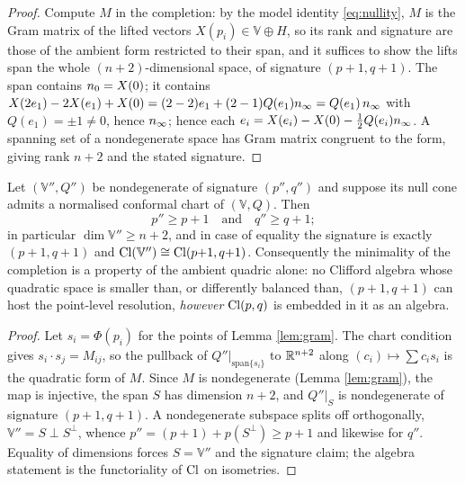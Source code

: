 \begin{proof}
Compute $M$ in the completion: by the model identity \eqref{eq:nullity}, $M$ is the Gram matrix of the lifted vectors $X(p_i) \in \mathbb{V} \oplus H$, so its rank and signature are those of the ambient form restricted to their span, and it suffices to show the lifts span the whole $(n{+}2)$-dimensional space, of signature $(p{+}1, q{+}1)$. The span contains $n_0 = X(0)$; it contains $X(2e_1) - 2X(e_1) + X(0) = (2 - 2)e_1 + (2 - 1)Q(e_1)n_\infty = Q(e_1)\,n_\infty$ with $Q(e_1) = \pm 1 \neq 0$, hence $n_\infty$; hence each $e_i = X(e_i) - X(0) - \tfrac12 Q(e_i)n_\infty$. A spanning set of a nondegenerate space has Gram matrix congruent to the form, giving rank $n+2$ and the stated signature.
\end{proof}

\begin{theorem}\label{thm:chartmin}
Let $(\mathbb{V}'', Q'')$ be nondegenerate of signature $(p'', q'')$ and suppose its null cone admits a normalised conformal chart of $(\mathbb{V}, Q)$. Then
\[
p'' \geq p + 1 \quad \text{and} \quad q'' \geq q + 1 ;
\]
in particular $\dim \mathbb{V}'' \geq n + 2$, and in case of equality the signature is exactly $(p{+}1, q{+}1)$ and $\mathrm{Cl}(\mathbb{V}'') \cong \mathrm{Cl}(p{+}1, q{+}1)$. Consequently the minimality of the completion is a property of the ambient quadric alone: no Clifford algebra whose quadratic space is smaller than, or differently balanced than, $(p{+}1, q{+}1)$ can host the point-level resolution, \emph{however} $\mathrm{Cl}(p,q)$ is embedded in it as an algebra.
\end{theorem}

\begin{proof}
Let $s_i = \Phi(p_i)$ for the points of Lemma \ref{lem:gram}. The chart condition gives $s_i \cdot s_j = M_{ij}$, so the pullback of $Q''|_{\mathrm{span}\{s_i\}}$ to $\mathbb{R}^{n+2}$ along $(c_i) \mapsto \sum c_i s_i$ is the quadratic form of $M$. Since $M$ is nondegenerate (Lemma \ref{lem:gram}), the map is injective, the span $S$ has dimension $n+2$, and $Q''|_S$ is nondegenerate of signature $(p{+}1, q{+}1)$. A nondegenerate subspace splits off orthogonally, $\mathbb{V}'' = S \perp S^\perp$, whence $p'' = (p{+}1) + p(S^\perp) \geq p+1$ and likewise for $q''$. Equality of dimensions forces $S = \mathbb{V}''$ and the signature claim; the algebra statement is the functoriality of $\mathrm{Cl}$ on isometries.
\end{proof}

